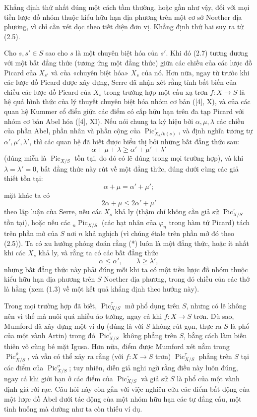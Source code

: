 Khẳng định thứ nhất đúng một cách tầm thường, hoặc gần như vậy, đối với mọi
tiền lược đồ nhóm thuộc kiểu hữu hạn địa phương trên một cơ sở Noether địa
phương, vì chỉ cần xét dọc theo tiết diện đơn vị. Khẳng định thứ hai suy ra từ
(2.5).

 Cho $s,s'\in S$ sao cho $s$ là một chuyên biệt hóa của
$s'$. Khi đó (2.7) tương đương với một bất đẳng thức (tương ứng một đẳng thức)
giữa các chiều của các lược đồ Picard của $X_{s'}$ và của «chuyên biệt hóa»
$X_s$ của nó. Hơn nữa, ngay từ trước khi các lược đồ Picard được xây dựng,
Serre đã nhận xét rằng tính bất biến của chiều các lược đồ Picard của $X_s$ trong
trường hợp một cấu xạ trơn $f:X\longrightarrow S$ là hệ quả hình thức của lý
thuyết chuyên biệt hóa nhóm cơ bản ([4], X), và của các quan hệ Kummer cổ điển
giữa các điểm có cấp hữu hạn trên đa tạp Picard với nhóm cơ bản Abel hóa ([4],
XI). Nếu nói chung ta ký hiệu bởi $\alpha,\mu,\lambda$ các chiều của phần Abel,
phần nhân và phần cộng của $\operatorname{Pic}_{X_s/k(s)}^\circ$, và định
nghĩa tương tự $\alpha',\mu',\lambda'$, thì các quan hệ đã biết được biểu thị
bởi những bất đẳng thức sau:
\[
\tag{*}\alpha+\mu+\lambda\geq\alpha'+\mu'+\lambda'
\]
(đúng miễn là $\operatorname{Pic}_{X/S}$ tồn tại, do đó có lẽ đúng trong mọi
trường hợp), và khi $\lambda=\lambda'=0$, bất đẳng thức này rút về một đẳng
thức, đúng dưới cùng các giả thiết tồn tại:
\[
\alpha+\mu=\alpha'+\mu' ;
\]
mặt khác ta có
\[
\tag{**}2\alpha+\mu\leq2\alpha'+\mu'
\]
theo lập luận của Serre, nếu các $X_s$ khả ly (thậm chí không cần giả sử
$\operatorname{Pic}_{X/S}^\tau$ tồn tại), hoặc nếu các
${}_n\operatorname{Pic}_{X/S}$ (các hạt nhân của $\varphi_n$ trong hàm tử
Picard) tách trên phần mở của $S$ nơi $n$ khả nghịch (vì chúng étale trên phần mở đó theo (2.5)). Ta có xu hướng
phỏng đoán rằng (*) luôn là một đẳng thức, hoặc ít nhất khi các $X_s$ khả ly,
và rằng ta có các bất đẳng thức
\[
\tag{***}\alpha\leq\alpha',\qquad\lambda\geq\lambda',
\]
những bất đẳng thức này phải đúng mỗi khi ta có một tiền lược đồ nhóm thuộc
kiểu hữu hạn địa phương trên $S$ Noether địa phương, trong đó chiều của các
thớ là hằng (xem (1.3) về một kết quả khẳng định theo hướng này).

 Trong mọi trường hợp đã biết,
$\operatorname{Pic}_{X/S}^\tau$ mở phổ dụng trên $S$, nhưng có lẽ không nên vì
thế mà nuôi quá nhiều ảo tưởng, ngay cả khi $f:X\longrightarrow S$ trơn. Dù
sao, Mumford đã xây dựng một ví dụ (đúng là với $S$ không rút gọn, thực ra $S$
là phổ của một vành Artin) trong đó $\operatorname{Pic}_{X/S}^\tau$ không
phẳng trên $S$, bằng cách làm biến thiên vô cùng bé mặt Igusa. Hơn nữa, điểm
được Mumford xét nằm trong $\operatorname{Pic}_{X/S}^\rho$, và vẫn có thể xảy
ra rằng (với $f:X\longrightarrow S$ trơn) $\operatorname{Pic}_{X/S}^\tau$
phẳng trên $S$ tại các điểm của $\operatorname{Pic}_{X/S}^\sigma$; tuy nhiên,
diễn giả nghi ngờ rằng điều này luôn đúng, ngay cả khi giới hạn ở các điểm của
$\operatorname{Pic}_{X/S}^\circ$ và giả sử $S$ là phổ của một vành định giá
rời rạc. Câu hỏi này còn gắn với việc nghiên cứu các điểm bất động của một
lược đồ Abel dưới tác động của một nhóm hữu hạn các tự đẳng cấu, một tình
huống mà dường như ta còn thiếu ví dụ.

